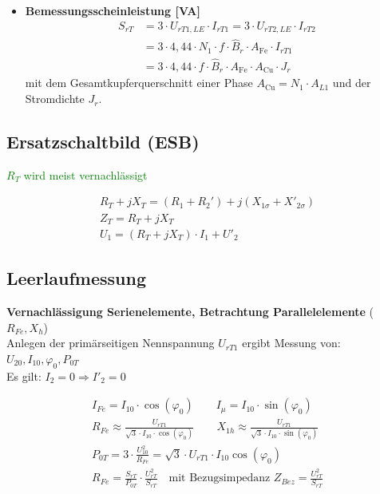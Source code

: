 \begin{itemize}
        \item[] {\textbf{Bemessungsscheinleistung [VA]}}
            \begin{align*}
                S_{rT} &= 3 \cdot U_{rT1,LE} \cdot I_{rT1} = 3 \cdot U_{rT2,LE} \cdot I_{rT2} \\
                       &= 3 \cdot 4,44 \cdot N_1 \cdot f \cdot \hat{B}_r \cdot A_{\text{Fe}} \cdot I_{rT1} \\
                       &= 3 \cdot 4,44 \cdot f \cdot \hat{B}_r \cdot A_{\text{Fe}} \cdot A_{\text{Cu}} \cdot J_r
            \end{align*}
            mit dem Gesamtkupferquerschnitt einer Phase \(A_{\text{Cu}} = N_1 \cdot A_{L1}\) und der Stromdichte \(J_r\).
\end{itemize}

\subsection{Ersatzschaltbild (ESB)}
    \textcolor{green}{\(R_{T}\) wird meist vernachlässigt}

    \begin{gather*}
        R_{T} + jX_{T} = (R_1+R_2')+j(X_{1\sigma}+X'_{2\sigma})\\
        Z_{T} = R_{T} + jX_{T}\\
        U_1 = (R_T + jX_T) \cdot I_1 + U'_2
    \end{gather*}

\subsection{Leerlaufmessung}
    \textbf{Vernachlässigung Serienelemente, Betrachtung Parallelelemente} (\(R_{Fe}, X_h\)) \\
    Anlegen der primärseitigen Nennspannung \(U_{rT1}\) ergibt Messung von: 
    \(U_{20}, I_{10}, \varphi_0, P_{0T}\) \\
    Es gilt: \(I_2 = 0 \Rightarrow I'_2 = 0\)

    \begin{gather*}
        I_{Fe} = I_{10} \cdot \cos(\varphi_0) \qquad I_{\mu} = I_{10} \cdot \sin(\varphi_0) \\
        R_{Fe} \approx \frac{U_{rT1}}{\sqrt{3} \cdot I_{10} \cdot \cos(\varphi_0)} \qquad X_{1h} \approx \frac{U_{rT1}}{\sqrt{3} \cdot I_{10} \cdot \sin(\varphi_0)} \\
        P_{0T} = 3 \cdot \frac{U_{10}^2}{R_{Fe}} = \sqrt{3} \cdot U_{rT1} \cdot I_{10} \cos(\varphi_0) \\
        \boxed{R_{Fe} = \frac{S_{rT}}{P_{0T}} \cdot \frac{U_{rT}^2}{S_{rT}}} \quad \text{mit Bezugsimpedanz } Z_{Bez} = \frac{U_{rT}^2}{S_{rT}}
    \end{gather*}

